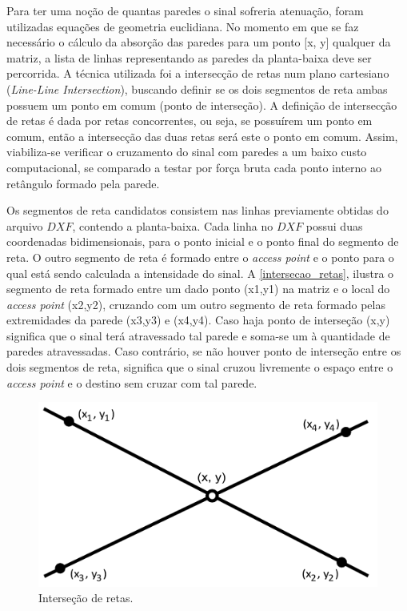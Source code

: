 \documentclass[
	12pt,				%
	twoside,			%
	a4paper,			%
	english,			%
	french,				%
	spanish,			%
	brazil				%
	]{abntex2}
\begin{document}
Para ter uma noção de quantas paredes o sinal sofreria atenuação, foram
utilizadas equações de geometria euclidiana. No momento em que se faz
necessário o cálculo da absorção das paredes para um ponto {[}x, y{]}
qualquer da matriz, a lista de linhas representando as paredes da
planta-baixa deve ser percorrida. A técnica utilizada foi a intersecção
de retas num plano cartesiano (\emph{Line-Line Intersection}), buscando
definir se os dois segmentos de reta ambas possuem um ponto em comum
(ponto de interseção). A definição de intersecção de retas é dada por
retas concorrentes, ou seja, se possuírem um ponto em comum, então a
intersecção das duas retas será este o ponto em comum. Assim,
viabiliza-se verificar o cruzamento do sinal com paredes a um baixo
custo computacional, se comparado a testar por força bruta cada ponto
interno ao retângulo formado pela parede.

Os segmentos de reta candidatos consistem nas linhas previamente obtidas
do arquivo \(DXF\), contendo a planta-baixa. Cada linha no \(DXF\)
possui duas coordenadas bidimensionais, para o ponto inicial e o ponto
final do segmento de reta. O outro segmento de reta é formado entre o
\emph{access point} e o ponto para o qual está sendo calculada a
intensidade do sinal. A \autoref{intersecao_retas}, ilustra o segmento
de reta formado entre um dado ponto (x1,y1) na matriz e o local do
\emph{access point} (x2,y2), cruzando com um outro segmento de reta
formado pelas extremidades da parede (x3,y3) e (x4,y4). Caso haja ponto
de interseção (x,y) significa que o sinal terá atravessado tal parede e
soma-se um à quantidade de paredes atravessadas. Caso contrário, se não
houver ponto de interseção entre os dois segmentos de reta, significa
que o sinal cruzou livremente o espaço entre o \emph{access point} e o
destino sem cruzar com tal parede.

\begin{figure}[ht]
    \caption{\label{intersecao_retas} Interseção de retas.}
    \begin{center}
        \includegraphics[scale=0.5]{imagens/inter.jpg}
    \end{center}
\end{figure}
\end{document}
